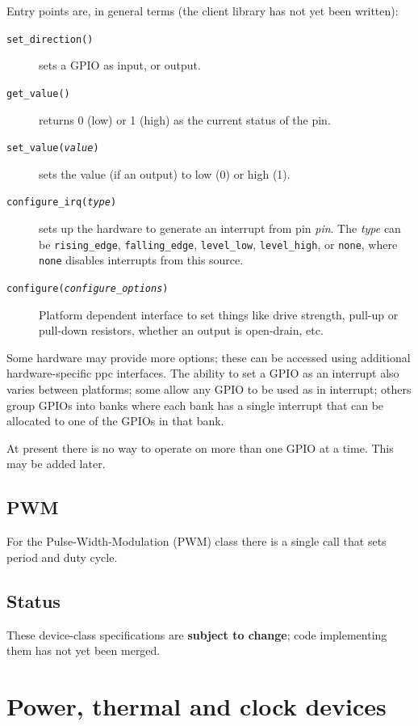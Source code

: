 \documentclass[a4paper,12pt]{report}
\begin{document}
Entry points are, in general terms (the client library has not yet
been written):
\begin{description}
\item[\texttt{set\_direction()}]
  sets a GPIO as input, or output.
\item[\texttt{get\_value()}] returns 0 (low) or 1 (high) as
  the current status of the pin.
\item[\texttt{set\_value(\emph{value})}] sets the value
  (if an output) to low (0) or high (1).
\item[\texttt{configure\_irq(\emph{type})}] sets up the
  hardware to generate an interrupt from pin \emph{pin}.  The
  \emph{type} can be \texttt{rising\_edge}, \texttt{falling\_edge},
  \texttt{level\_low}, \texttt{level\_high}, or \texttt{none}, where
  \texttt{none} disables interrupts from this source.
\item[\texttt{configure(\emph{configure\_options})}] Platform
  dependent interface to set things like drive strength, pull-up or
  pull-down resistors, whether an output is open-drain, etc.
\end{description}

Some hardware may provide more options; these can be accessed
using additional hardware-specific \gls{ppc} interfaces.  The
ability to set a GPIO as an interrupt also varies between platforms;
some allow any GPIO to be used as in interrupt; others group GPIOs
into banks where each bank has a single interrupt that can be
allocated to one of the GPIOs in that bank.

At present there is no way to operate on more than one GPIO at a time.
This may be added later.

\subsection{PWM}\label{s:pwm}
For the Pulse-Width-Modulation (PWM) class there is
a single call that sets period and duty cycle.

\subsection{Status}

These device-class specifications are \textbf{subject to change}; code
implementing them has not yet been merged.

\section{Power, thermal and clock devices}\label{s:sensors}
\end{document}
